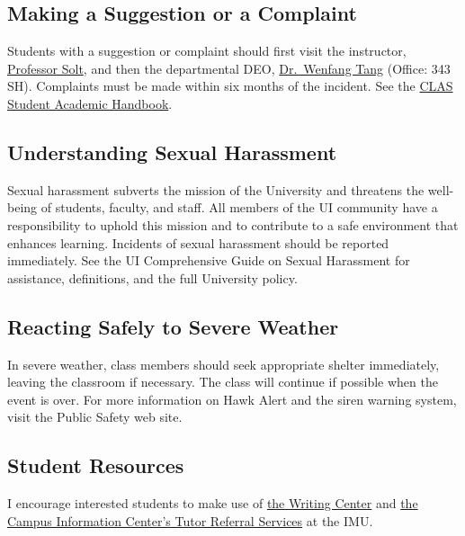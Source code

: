 \documentclass[11pt]{article}\usepackage[]{graphicx}\usepackage[]{color}
\begin{document}
\subsection*{Making a Suggestion or a Complaint}
Students with a suggestion or complaint should first visit the instructor, \href{mailto:frederick-solt@uiowa.edu}{Professor Solt}, and then the departmental DEO, \href{mailto:wenfang-tang@uiowa.edu}{Dr.~Wenfang Tang} (Office: 343 SH). Complaints must be made within six months of the incident. See the \href{http://clas.uiowa.edu/students/handbook}{CLAS Student Academic Handbook}.

\subsection*{Understanding Sexual Harassment}
Sexual harassment subverts the mission of the University and threatens the well-being of students, faculty, and staff. All members of the UI community have a responsibility to uphold this mission and to contribute to a safe environment that enhances learning. Incidents of sexual harassment should be reported immediately. See the UI Comprehensive Guide on Sexual Harassment for assistance, definitions, and the full University policy.

\subsection*{Reacting Safely to Severe Weather}
In severe weather, class members should seek appropriate shelter immediately, leaving the classroom if necessary. The class will continue if possible when the event is over. For more information on Hawk Alert and the siren warning system, visit the Public Safety web site.

\subsection*{Student Resources}
I encourage interested students to make use of \href{http://www.uiowa.edu/~writingc/}{the Writing Center} and \href{http://imu.uiowa.edu/cic/}{the Campus Information Center's Tutor Referral Services} at the IMU.
\end{document}
